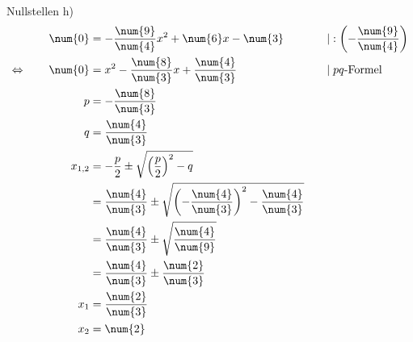\begin{exercise}
\begin{minipage}[t]{0.49\linewidth}
\begin{equation*}
\begin{split}
        \end{split}
      \end{equation*}
    \end{minipage}%
    \hfill
    \begin{minipage}[t]{0.49\linewidth}
      Nullstellen h)
      \small
      \begingroup
        \newcommand{\vstrut}{\vphantom{\left(f_0^0\right)}}%
        \newcommand{\noeq}{\phantom{\Leftrightarrow}\vstrut&\quad}%
        \newcommand{\iseq}{\Leftrightarrow\vstrut&\quad}%
        \newcommand{\impl}{\Rightarrow\vstrut&\quad}%
        \newcommand{\nomod}{\quad&\phantom{|}}%
        \newcommand{\domod}[1]{\quad&|#1}%
        \begin{alignat*}{3}
          \noeq
          &
          \num{0}&=-\frac{\num{9}}{\num{4}}x^{2}+\num{6}x-\num{3}
          &
          \domod{:\left(-\frac{\num{9}}{\num{4}}\right)}
          \\
          \iseq
          &
          \num{0}&=x^{2}-\frac{\num{8}}{\num{3}}x+\frac{\num{4}}{\num{3}}
          &
          \domod{\;\text{$pq$-Formel}}
          \\
          \noeq
          &
          p&=-\frac{\num{8}}{\num{3}}
          &
          \nomod
          \\
          \noeq
          &
          q&=\frac{\num{4}}{\num{3}}
          &
          \nomod
          \\
          \noeq
          &
          x_{1,2}&=-\frac{p}{2}\pm\sqrt{\left(\frac{p}{2}\right)^2-q}
          &
          \nomod
          \\
          \noeq
          &
          &=\frac{\num{4}}{\num{3}}\pm\sqrt{\left(-\frac{\num{4}}{\num{3}}\right)^2-\frac{\num{4}}{\num{3}}}
          &
          \nomod
          \\
          \noeq
          &
          &=\frac{\num{4}}{\num{3}}\pm\sqrt{\frac{\num{4}}{\num{9}}}
          &
          \nomod
          \\
          \noeq
          &
          &=\frac{\num{4}}{\num{3}}\pm\frac{\num{2}}{\num{3}}
          &
          \nomod
          \\
          \noeq
          &
          x_1&=\frac{\num{2}}{\num{3}}
          &
          \nomod
          \\
          \noeq
          &
          x_2&=\num{2}
          &
          \nomod
        \end{alignat*}
      \endgroup

\end{minipage}
\end{exercise}
